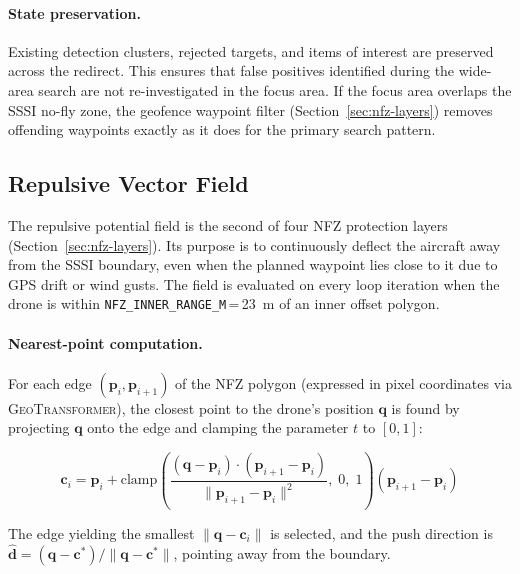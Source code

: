 \paragraph{State preservation.}
Existing detection clusters, rejected targets, and items of interest are preserved across the redirect. This ensures that false positives identified during the wide-area search are not re-investigated in the focus area. If the focus area overlaps the SSSI no-fly zone, the geofence waypoint filter (Section~\ref{sec:nfz-layers}) removes offending waypoints exactly as it does for the primary search pattern.

\subsection{Repulsive Vector Field}\label{sec:repulsive-field}

The repulsive potential field is the second of four NFZ protection layers (Section~\ref{sec:nfz-layers}). Its purpose is to continuously deflect the aircraft away from the SSSI boundary, even when the planned waypoint lies close to it due to GPS drift or wind gusts. The field is evaluated on every loop iteration when the drone is within \texttt{NFZ\_INNER\_RANGE\_M}\,=\,\SI{23}{\metre} of an inner offset polygon.

\paragraph{Nearest-point computation.}
For each edge $(\mathbf{p}_i, \mathbf{p}_{i+1})$ of the NFZ polygon (expressed in pixel coordinates via \textsc{GeoTransformer}), the closest point to the drone's position $\mathbf{q}$ is found by projecting $\mathbf{q}$ onto the edge and clamping the parameter $t$ to $[0, 1]$:

\begin{equation}\label{eq:closest-pt}
  \mathbf{c}_i = \mathbf{p}_i + \text{clamp}\!\left(\frac{(\mathbf{q} - \mathbf{p}_i) \cdot (\mathbf{p}_{i+1} - \mathbf{p}_i)}{\|\mathbf{p}_{i+1} - \mathbf{p}_i\|^2},\; 0,\; 1\right) (\mathbf{p}_{i+1} - \mathbf{p}_i)
\end{equation}

\noindent The edge yielding the smallest $\|\mathbf{q} - \mathbf{c}_i\|$ is selected, and the push direction is $\hat{\mathbf{d}} = (\mathbf{q} - \mathbf{c}^*) / \|\mathbf{q} - \mathbf{c}^*\|$, pointing away from the boundary.


